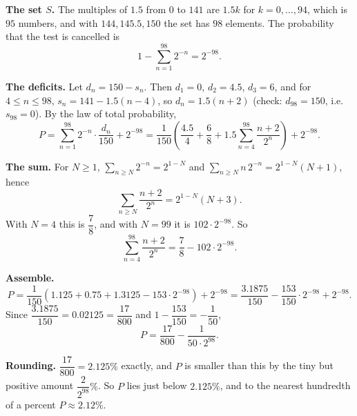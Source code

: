 \textbf{The set $S$.} The multiples of $1.5$ from $0$ to $141$ are $1.5k$ for $k=0,\dots,94$, which is $95$ numbers, and with $144,145.5,150$ the set has $98$ elements. The probability that the test is cancelled is
\[1-\sum_{n=1}^{98}2^{-n}=2^{-98}.\]

\textbf{The deficits.} Let $d_n=150-s_n$. Then $d_1=0$, $d_2=4.5$, $d_3=6$, and for $4\le n\le98$, $s_n=141-1.5(n-4)$, so $d_n=1.5(n+2)$ (check: $d_{98}=150$, i.e. $s_{98}=0$). By the law of total probability,
\[P=\sum_{n=1}^{98}2^{-n}\cdot\dfrac{d_n}{150}+2^{-98}=\dfrac{1}{150}\left(\dfrac{4.5}{4}+\dfrac{6}{8}+1.5\sum_{n=4}^{98}\dfrac{n+2}{2^n}\right)+2^{-98}.\]

\textbf{The sum.} For $N\ge1$, $\displaystyle\sum_{n\ge N}2^{-n}=2^{1-N}$ and $\displaystyle\sum_{n\ge N}n\,2^{-n}=2^{1-N}(N+1)$, hence
\[\sum_{n\ge N}\dfrac{n+2}{2^n}=2^{1-N}(N+3).\]
With $N=4$ this is $\dfrac{7}{8}$, and with $N=99$ it is $102\cdot2^{-98}$. So
\[\sum_{n=4}^{98}\dfrac{n+2}{2^n}=\dfrac{7}{8}-102\cdot2^{-98}.\]

\textbf{Assemble.}
\[P=\dfrac{1}{150}\left(1.125+0.75+1.3125-153\cdot2^{-98}\right)+2^{-98}=\dfrac{3.1875}{150}-\dfrac{153}{150}\cdot2^{-98}+2^{-98}.\]
Since $\dfrac{3.1875}{150}=0.02125=\dfrac{17}{800}$ and $1-\dfrac{153}{150}=-\dfrac{1}{50}$,
\[\boxed{P=\dfrac{17}{800}-\dfrac{1}{50\cdot2^{98}}}.\]

\textbf{Rounding.} $\dfrac{17}{800}=2.125\%$ exactly, and $P$ is smaller than this by the tiny but positive amount $\dfrac{2}{2^{98}}\%$. So $P$ lies just below $2.125\%$, and to the nearest hundredth of a percent $P\approx\boxed{2.12\%}$.
